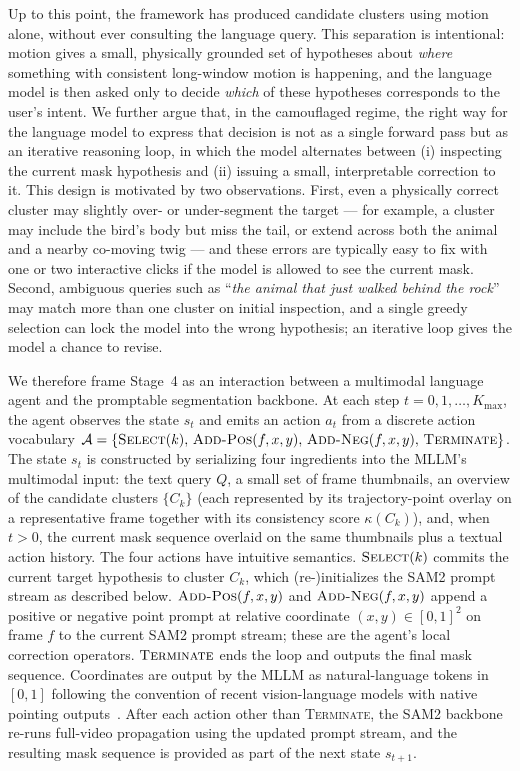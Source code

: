 \documentclass[11pt]{article}
\begin{document}
Up to this point, the framework has produced candidate clusters using motion alone, without ever consulting the language query.
This separation is intentional: motion gives a small, physically grounded set of hypotheses about \emph{where} something with consistent long-window motion is happening, and the language model is then asked only to decide \emph{which} of these hypotheses corresponds to the user's intent.
We further argue that, in the camouflaged regime, the right way for the language model to express that decision is not as a single forward pass but as an iterative reasoning loop, in which the model alternates between (i) inspecting the current mask hypothesis and (ii) issuing a small, interpretable correction to it.
This design is motivated by two observations.
First, even a physically correct cluster may slightly over- or under-segment the target --- for example, a cluster may include the bird's body but miss the tail, or extend across both the animal and a nearby co-moving twig --- and these errors are typically easy to fix with one or two interactive clicks if the model is allowed to see the current mask.
Second, ambiguous queries such as ``\emph{the animal that just walked behind the rock}'' may match more than one cluster on initial inspection, and a single greedy selection can lock the model into the wrong hypothesis; an iterative loop gives the model a chance to revise.

We therefore frame Stage~4 as an interaction between a multimodal language agent and the promptable segmentation backbone.
At each step $t=0,1,\dots,K_{\max}$, the agent observes the state $s_t$ and emits an action $a_t$ from a discrete action vocabulary
$\mathcal{A}=\{\textsc{Select}(k),\, \textsc{Add-Pos}(f,x,y),\, \textsc{Add-Neg}(f,x,y),\, \textsc{Terminate}\}$.
The state $s_t$ is constructed by serializing four ingredients into the MLLM's multimodal input: the text query $Q$, a small set of frame thumbnails, an overview of the candidate clusters $\{C_k\}$ (each represented by its trajectory-point overlay on a representative frame together with its consistency score $\kappa(C_k)$), and, when $t>0$, the current mask sequence overlaid on the same thumbnails plus a textual action history.
The four actions have intuitive semantics.
$\textsc{Select}(k)$ commits the current target hypothesis to cluster $C_k$, which (re-)initializes the SAM2 prompt stream as described below.
$\textsc{Add-Pos}(f,x,y)$ and $\textsc{Add-Neg}(f,x,y)$ append a positive or negative point prompt at relative coordinate $(x,y)\in[0,1]^2$ on frame $f$ to the current SAM2 prompt stream; these are the agent's local correction operators.
$\textsc{Terminate}$ ends the loop and outputs the final mask sequence.
Coordinates are output by the MLLM as natural-language tokens in $[0,1]$ following the convention of recent vision-language models with native pointing outputs~\cite{qwenvl}.
After each action other than \textsc{Terminate}, the SAM2 backbone re-runs full-video propagation using the updated prompt stream, and the resulting mask sequence is provided as part of the next state $s_{t+1}$.
\end{document}
